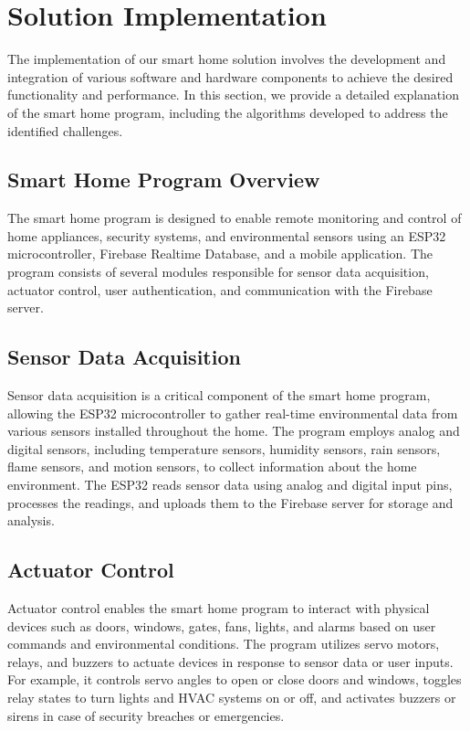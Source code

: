\section{Solution Implementation}
The implementation of our smart home solution involves the development and integration of various software and hardware components to achieve the desired functionality and performance. In this section, we provide a detailed explanation of the smart home program, including the algorithms developed to address the identified challenges.

\subsection{Smart Home Program Overview}
The smart home program is designed to enable remote monitoring and control of home appliances, security systems, and environmental sensors using an ESP32 microcontroller, Firebase Realtime Database, and a mobile application. The program consists of several modules responsible for sensor data acquisition, actuator control, user authentication, and communication with the Firebase server.

\subsection{Sensor Data Acquisition}
Sensor data acquisition is a critical component of the smart home program, allowing the ESP32 microcontroller to gather real-time environmental data from various sensors installed throughout the home. The program employs analog and digital sensors, including temperature sensors, humidity sensors, rain sensors, flame sensors, and motion sensors, to collect information about the home environment. The ESP32 reads sensor data using analog and digital input pins, processes the readings, and uploads them to the Firebase server for storage and analysis.

\subsection{Actuator Control}
Actuator control enables the smart home program to interact with physical devices such as doors, windows, gates, fans, lights, and alarms based on user commands and environmental conditions. The program utilizes servo motors, relays, and buzzers to actuate devices in response to sensor data or user inputs. For example, it controls servo angles to open or close doors and windows, toggles relay states to turn lights and HVAC systems on or off, and activates buzzers or sirens in case of security breaches or emergencies.

